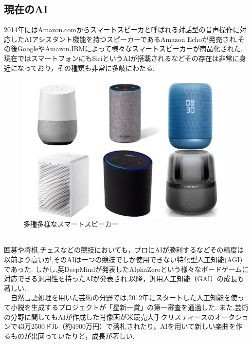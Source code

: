 \subsection{現在のAI}
2014年にはAmazon.comからスマートスピーカと呼ばれる対話型の音声操作に対応したAIアシスタント機能を持つスピーカーであるAmazon Echoが発売され,その後GoogleやAmazon,IBMによって様々なスマートスピーカーが商品化された.
現在ではスマートフォンにもSiriというAIが搭載されるなどその存在は非常に身近になっており，その種類も非常に多岐にわたる.
\begin{figure}[!ht]
    \begin{screen}
    \begin{center}
        \includegraphics[scale=0.6, clip]{./img/smartspeaker_list.jpg}
        \caption{多種多様なスマートスピーカー}
        \label{fig:多種多様なスマートスピーカー}
    \end{center}
\end{screen}
\end{figure}\\
囲碁や将棋,チェスなどの競技においても，プロにAIが勝利するなどその精度は以前より高いが,そのAIは一つの競技でしか使用できない特化型人工知能(AGI)であった.
しかし,英DeepMindが発表したAlphaZeroという様々なボードゲームに対応できる汎用性を持ったAIが発表され,以降，汎用人工知能（GAI）の成長も著しい.\\
　自然言語処理を用いた芸術の分野では,2012年にスタートした人工知能を使って小説を生成するプロジェクトが「星新一賞」の第一審査を通過した.\cite{webpage2}
また,芸術の分野に関してもAIが作成した肖像画が米競売大手クリスティーズのオークションで43万2500ドル（約4900万円）で落札されたり，AIを用いて新しい楽曲を作るものが出回っていたりと，成長が著しい.\cite{webpage3}\\
\newpage
